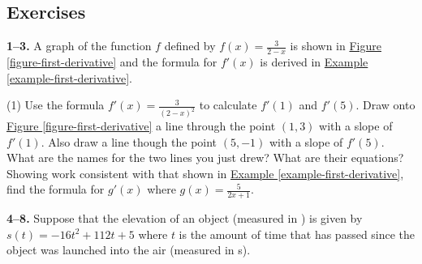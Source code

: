 \documentclass[10pt,oneside,]{book}
\theoremstyle{plain}
\theoremstyle{definition}
\numberwithin{equation}{section}
\newcommand{\fe}[2]{#1\mathopen{}\left(#2\right)\mathclose{}}
\newcommand{\point}[2]{\left(#1,#2\right)}
\newcommand{\fd}[1]{#1'}
\begin{document}
\subsection[Exercises]{Exercises}\label{exercises-21}
\textbf{1--3. }\hypertarget{exercisegroup-36}{\null}A graph of the function \(f\) defined by \(\fe{f}{x}=\frac{3}{2-x}\) is shown in \hyperref[figure-first-derivative]{Figure \ref{figure-first-derivative}} and the formula for \(\fe{\fd{f}}{x}\) is derived in \hyperref[example-first-derivative]{Example \ref{example-first-derivative}}.%
\par
\begin{exercisegroup}(1)
\exercise[1.]\hypertarget{exercise-184}{\null}Use the formula \(\fe{\fd{f}}{x}=\frac{3}{(2-x)^2}\) to calculate \(\fe{\fd{f}}{1}\) and \(\fe{\fd{f}}{5}\).%
\exercise[2.]\hypertarget{exercise-185}{\null}Draw onto \hyperref[figure-first-derivative]{Figure \ref{figure-first-derivative}} a line through the point \(\point{1}{3}\) with a slope of \(\fe{\fd{f}}{1}\). Also draw a line though the point \(\point{5}{-1}\) with a slope of \(\fe{\fd{f}}{5}\). What are the names for the two lines you just drew? What are their equations?%
\exercise[3.]\hypertarget{exercise-186}{\null}Showing work consistent with that shown in \hyperref[example-first-derivative]{Example \ref{example-first-derivative}}, find the formula for \(\fe{\fd{g}}{x}\) where \(\fe{g}{x}=\frac{5}{2x+1}\).%
\end{exercisegroup}
\par\smallskip\noindent
\textbf{4--8. }\hypertarget{exercisegroup-37}{\null}Suppose that the elevation of an object (measured in \si{\foot}) is given by \(\fe{s}{t}=-16t^2+112t+5\) where \(t\) is the amount of time that has passed since the object was launched into the air (measured in \si{\second}).%
\par
\end{document}
